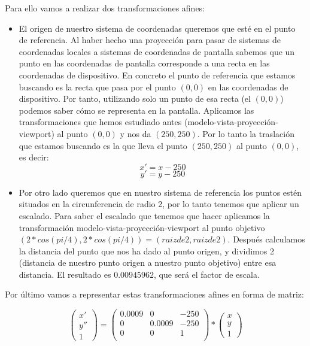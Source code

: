 \documentclass[a4paper,11pt, oneside]{book}
\begin{document}
Para ello vamos a realizar dos transformaciones afines:
\begin{itemize}
	\item El origen de nuestro sistema de coordenadas queremos que esté en el punto de referencia. Al haber hecho una proyección para pasar de sistemas de coordenadas locales a sistemas de coordenadas de pantalla sabemos que un punto en las coordenadas de pantalla corresponde a una recta en las coordenadas de dispositivo. En concreto el punto de referencia que estamos buscando es la recta que pasa por el punto $(0,0)$ en las coordenadas de dispositivo. Por tanto, utilizando solo un punto de esa recta (el $(0,0)$) podemos saber cómo se representa en la pantalla. Aplicamos las transformaciones que hemos estudiado antes (modelo-vista-proyección-viewport) al punto $(0,0)$ y nos da $(250,250)$. Por lo tanto la traslación que estamos buscando es la que lleva el punto $(250,250)$ al punto $(0,0)$, es decir:
	\begin{equation}
	x' = x-250
	\end{equation}
	\begin{equation}
	y' = y-250
	\end{equation}
	\item Por otro lado queremos que en nuestro sistema de referencia los puntos estén situados en la circunferencia de radio 2, por lo tanto tenemos que aplicar un escalado. Para saber el escalado que tenemos que hacer aplicamos la transformación modelo-vista-proyección-viewport al punto objetivo $(2*cos(pi/4),2*cos(pi/4) ) = (raiz de 2, raiz de 2)$. Después calculamos la distancia del punto que nos ha dado al punto origen, y dividimos 2 (distancia de nuestro punto origen a nuestro punto objetivo) entre esa distancia. El resultado es $0.00945962$, que será el factor de escala.
\end{itemize}
Por último vamos a representar estas transformaciones afines en forma de matriz:

\begin{equation}
\begin{pmatrix}
x'\\
y''\\
1
\end{pmatrix} =
\begin{pmatrix}
0.0009 &0&-250\\
0&0.0009&-250\\
0&0&1 \\
\end{pmatrix}
*\begin{pmatrix}
x\\
y\\
1
\end{pmatrix}
\end{equation}
\end{document}
